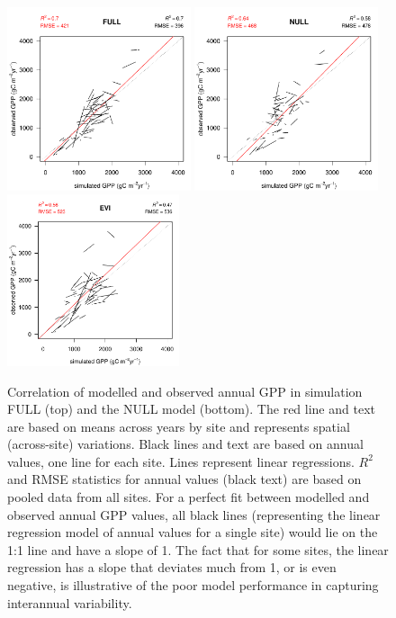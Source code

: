 \documentclass{myreport}
\begin{document}
\begin{figure}[!ht]
    \includegraphics[width=0.48\textwidth]{fig/modobs_spatial_annual_FULL.pdf}
    \includegraphics[width=0.48\textwidth]{fig/modobs_spatial_annual_NULL.pdf}\\
    \includegraphics[width=0.45\textwidth]{fig/modobs_spatial_annual_EVI.pdf}
    \caption{Correlation of modelled and observed annual GPP in simulation FULL (top) and the NULL model (bottom). The red line and text are based on means across years by site and represents spatial (across-site) variations. Black lines and text are based on annual values, one line for each site. Lines represent linear regressions. $R^2$ and RMSE statistics for annual values (black text) are based on pooled data from all sites. For a perfect fit between modelled and observed annual GPP values, all black lines (representing the linear regression model of annual values for a single site) would lie on the 1:1 line and have a slope of 1. The fact that for some sites, the linear regression has a slope that deviates much from 1, or is even negative, is illustrative of the poor model performance in capturing interannual variability.}
    \label{fig:modobs_spatialannual}
\end{figure}
\end{document}
